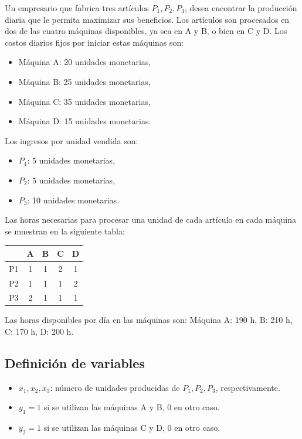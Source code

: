 \documentclass[12pt, a4paper, oneside]{book}
\theoremstyle{definition}
\begin{document}
Un empresario que fabrica tres artículos \(P_1, P_2, P_3\), desea encontrar la producción diaria que le permita maximizar sus beneficios. Los artículos son procesados en dos de las cuatro máquinas disponibles, ya sea en A y B, o bien en C y D. Los costos diarios fijos por iniciar estas máquinas son:

\begin{itemize}
    \item Máquina A: 20 unidades monetarias,
    \item Máquina B: 25 unidades monetarias,
    \item Máquina C: 35 unidades monetarias,
    \item Máquina D: 15 unidades monetarias.
\end{itemize}

Los ingresos por unidad vendida son:

\begin{itemize}
    \item \(P_1\): 5 unidades monetarias,
    \item \(P_2\): 5 unidades monetarias,
    \item \(P_3\): 10 unidades monetarias.
\end{itemize}

Las horas necesarias para procesar una unidad de cada artículo en cada máquina se muestran en la siguiente tabla:

\begin{center}
\begin{tabular}{|c|c|c|c|c|}
\hline
 & A & B & C & D \\
\hline
P1 & 1 & 1 & 2 & 1 \\
P2 & 1 & 1 & 1 & 2 \\
P3 & 2 & 1 & 1 & 1 \\
\hline
\end{tabular}
\end{center}

Las horas disponibles por día en las máquinas son:  
Máquina A: 190 h, B: 210 h, C: 170 h, D: 200 h.

\subsection{Definición de variables}

\begin{itemize}
    \item \(x_1, x_2, x_3\): número de unidades producidas de \(P_1, P_2, P_3\), respectivamente.
    \item \(y_1 = 1\) si se utilizan las máquinas A y B, 0 en otro caso.
    \item \(y_2 = 1\) si se utilizan las máquinas C y D, 0 en otro caso.
\end{itemize}
\end{document}
